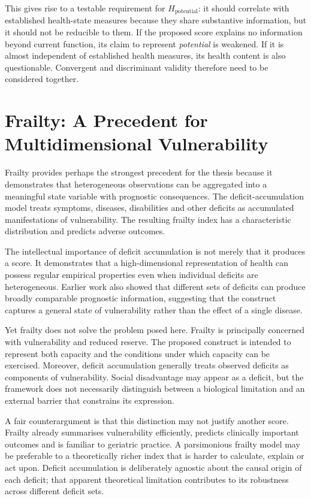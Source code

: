 This gives rise to a testable requirement for $H_{\text{potential}}$: it should correlate with established health-state measures because they share substantive information, but it should not be reducible to them. If the proposed score explains no information beyond current function, its claim to represent \emph{potential} is weakened. If it is almost independent of established health measures, its health content is also questionable. Convergent and discriminant validity therefore need to be considered together.

\section{Frailty: A Precedent for Multidimensional Vulnerability}

Frailty provides perhaps the strongest precedent for the thesis because it demonstrates that heterogeneous observations can be aggregated into a meaningful state variable with prognostic consequences. The deficit-accumulation model treats symptoms, diseases, disabilities and other deficits as accumulated manifestations of vulnerability. The resulting frailty index has a characteristic distribution and predicts adverse outcomes. \cite{rockwood_mitnitski_2007}

The intellectual importance of deficit accumulation is not merely that it produces a score. It demonstrates that a high-dimensional representation of health can possess regular empirical properties even when individual deficits are heterogeneous. Earlier work also showed that different sets of deficits can produce broadly comparable prognostic information, suggesting that the construct captures a general state of vulnerability rather than the effect of a single disease. \cite{rockwood_mitnitski_2007}

Yet frailty does not solve the problem posed here. Frailty is principally concerned with vulnerability and reduced reserve. The proposed construct is intended to represent both capacity and the conditions under which capacity can be exercised. Moreover, deficit accumulation generally treats observed deficits as components of vulnerability. Social disadvantage may appear as a deficit, but the framework does not necessarily distinguish between a biological limitation and an external barrier that constrains its expression.

A fair counterargument is that this distinction may not justify another score.
Frailty already summarises vulnerability efficiently, predicts clinically
important outcomes and is familiar to geriatric practice. A parsimonious
frailty model may be preferable to a theoretically richer index that is harder
to calculate, explain or act upon. Deficit accumulation is deliberately
agnostic about the causal origin of each deficit; that apparent theoretical
limitation contributes to its robustness across different deficit sets.

